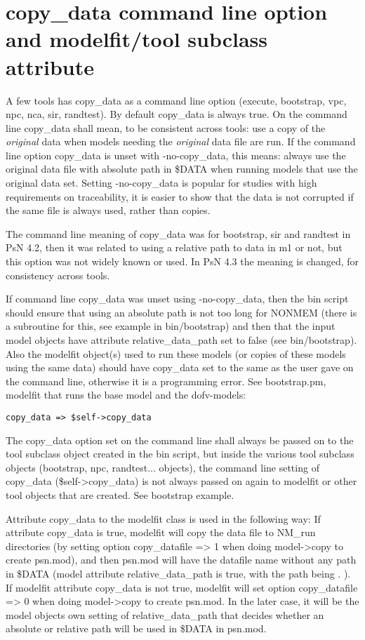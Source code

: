 \section{copy\_data command line option and modelfit/tool subclass attribute}
A few tools has copy\_data as a command line option (execute, bootstrap, vpc, npc, nca, sir, randtest).
By default copy\_data is always true. On the
command line copy\_data shall mean, to be consistent across tools:
use a copy of the \emph{original} data when models needing the \emph{original}
data file are run. If the command line option copy\_data is unset with -no-copy\_data, this means: always use the
original data file with absolute path in \$DATA when running models that use the original data set. Setting -no-copy\_data
is popular for studies with high requirements on traceability, it is easier to show that the data is not corrupted
if the same file is always used, rather than copies.

The command line meaning of copy\_data was for bootstrap, sir and randtest in PsN 4.2, then it was related to using a relative path to data in m1 or not, but this option was not widely known or used. In PsN 4.3 the meaning is changed, for consistency across tools.

If command line copy\_data was unset using -no-copy\_data, then the bin script should ensure that using an absolute path is not too long for NONMEM (there is a subroutine for this, see example in bin/bootstrap) and then that the input model objects have attribute relative\_data\_path set to false (see bin/bootstrap).
Also the modelfit object(s) used to run these models (or copies of these models using the same data) should have copy\_data set to the same as the user gave on the command line, otherwise it is a programming error. See bootstrap.pm, modelfit that runs the base model and the dofv-models:
\begin{verbatim}
copy_data => $self->copy_data
\end{verbatim}

The copy\_data option set on the command line shall always be passed on to the tool subclass object created in the bin script, but inside the various tool subclass objects (bootstrap, npc, randtest... objects), the command line setting of copy\_data (\$self->copy\_data) is not always passed on again to modelfit or other tool objects
that are created. See bootstrap example.

Attribute copy\_data to the modelfit class is used in the following way:
If attribute copy\_data is true, modelfit will copy the data file
to NM\_run directories (by setting option copy\_datafile => 1 when doing model->copy to create psn.mod),
and then psn.mod will have the datafile name without any path in \$DATA (model attribute relative\_data\_path is true, with
the path being . ). If modelfit attribute copy\_data is not true,
modelfit will set option copy\_datafile => 0 when doing model->copy to create psn.mod.
In the later case, it will be the model objects own setting of relative\_data\_path that decides
whether an absolute or relative path will be used in \$DATA in psn.mod.

